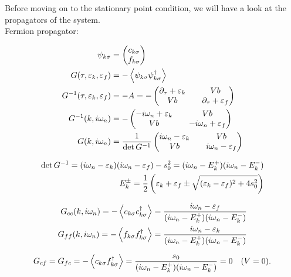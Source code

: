 Before moving on to the stationary point condition, we will have a look at the propagators of the system. \\ 

Fermion propagator: 

\begin{align*}
    \psi_{k\sigma} &= \begin{pmatrix} c_{k\sigma} \\ f_{k\sigma} \end{pmatrix} \\ 
    G(\tau, \varepsilon_k, \varepsilon_f) &= -\expval{\psi_{k\sigma} \psi_{k\sigma}^\dagger} \\ 
    G^{-1}(\tau, \varepsilon_k, \varepsilon_f) &= -A = - \begin{pmatrix} \partial_\tau +\varepsilon_k && Vb \\ Vb && \partial_\tau + \varepsilon_f \end{pmatrix} \\ 
    G^{-1}(k, i\omega_n) &= - \begin{pmatrix} -i\omega_n +\varepsilon_k && Vb \\ Vb && -i\omega_n + \varepsilon_f \end{pmatrix} \\
    G(k, i\omega_n) &= \frac{1}{\det G^{-1}} \begin{pmatrix} i\omega_n - \varepsilon_k && Vb \\ Vb && i\omega_n - \varepsilon_f \end{pmatrix}
\end{align*}

\begin{align*}
    \det G^{-1} = (i\omega_n - \varepsilon_k)(i\omega_n - \varepsilon_f) - s_0^2 = (i\omega_n - E_k^+)(i\omega_n - E_k^-) \\ 
    E_k^\pm = \frac{1}{2}\left(\varepsilon_k + \varepsilon_f \pm \sqrt{(\varepsilon_k - \varepsilon_f)^2 + 4s_0^2}\right)
\end{align*}

\begin{align*}
    G_{cc}(k,i\omega_n) = -\expval{c_{k\sigma} c_{k\sigma}^\dagger} = \frac{i\omega_n - \varepsilon_f}{(i\omega_n - E_k^+)(i\omega_n - E_k^-)} \\ 
    G_{ff}(k,i\omega_n) = -\expval{f_{k\sigma} f_{k\sigma}^\dagger} = \frac{i\omega_n - \varepsilon_k}{(i\omega_n - E_k^+)(i\omega_n - E_k^-)}
\end{align*}

\begin{align*}
    G_{cf} = G_{fc} = -\expval{c_{k\sigma} f_{k\sigma}^\dagger} = \frac{s_0}{(i\omega_n - E_k^+)(i\omega_n - E_k^-)} = 0 \quad (V = 0).
\end{align*}

